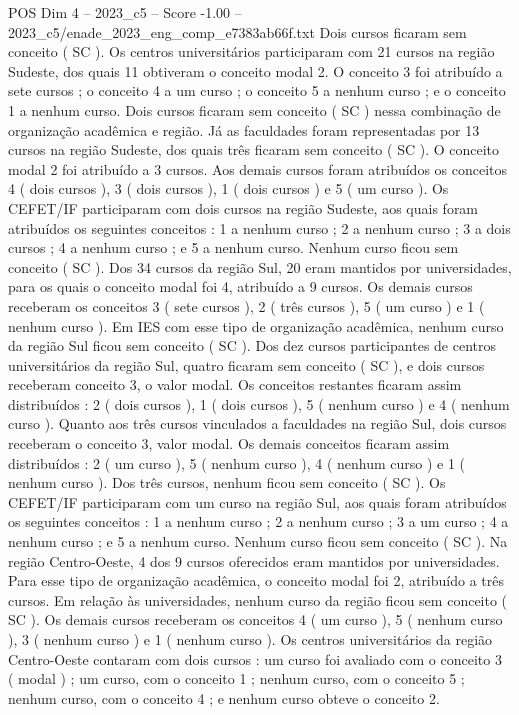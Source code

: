 \begin{textsample}{POS Dim 4 – 2023\_c5 – Score -1.00 – 2023\_c5/enade\_2023\_eng\_comp\_e7383ab66f.txt}
Dois cursos ficaram sem conceito ( SC ).
Os centros universitários participaram com 21 cursos na região Sudeste, dos quais 11 obtiveram o conceito modal 2.
O conceito 3 foi atribuído a sete cursos ; o conceito 4 a um curso ; o conceito 5 a nenhum curso ; e o conceito 1 a nenhum curso.
Dois cursos ficaram sem conceito ( SC ) nessa combinação de organização acadêmica e região.
Já as faculdades foram representadas por 13 cursos na região Sudeste, dos quais três ficaram sem conceito ( SC ).
O conceito modal 2 foi atribuído a 3 cursos.
Aos demais cursos foram atribuídos os conceitos 4 ( dois cursos ), 3 ( dois cursos ), 1 ( dois cursos ) e 5 ( um curso ).
Os CEFET/IF participaram com dois cursos na região Sudeste, aos quais foram atribuídos os seguintes conceitos : 1 a nenhum curso ; 2 a nenhum curso ; 3 a dois cursos ; 4 a nenhum curso ; e 5 a nenhum curso.
Nenhum curso ficou sem conceito ( SC ).
Dos 34 cursos da região Sul, 20 eram mantidos por universidades, para os quais o conceito modal foi 4, atribuído a 9 cursos.
Os demais cursos receberam os conceitos 3 ( sete cursos ), 2 ( três cursos ), 5 ( um curso ) e 1 ( nenhum curso ).
Em IES com esse tipo de organização acadêmica, nenhum curso da região Sul ficou sem conceito ( SC ).
Dos dez cursos participantes de centros universitários da região Sul, quatro ficaram sem conceito ( SC ), e dois cursos receberam conceito 3, o valor modal.
Os conceitos restantes ficaram assim distribuídos : 2 ( dois cursos ), 1 ( dois cursos ), 5 ( nenhum curso ) e 4 ( nenhum curso ).
Quanto aos três cursos vinculados a faculdades na região Sul, dois cursos receberam o conceito 3, valor modal.
Os demais conceitos ficaram assim distribuídos : 2 ( um curso ), 5 ( nenhum curso ), 4 ( nenhum curso ) e 1 ( nenhum curso ).
Dos três cursos, nenhum ficou sem conceito ( SC ).
Os CEFET/IF participaram com um curso na região Sul, aos quais foram atribuídos os seguintes conceitos : 1 a nenhum curso ; 2 a nenhum curso ; 3 a um curso ; 4 a nenhum curso ; e 5 a nenhum curso.
Nenhum curso ficou sem conceito ( SC ).
Na região Centro-Oeste, 4 dos 9 cursos oferecidos eram mantidos por universidades.
Para esse tipo de organização acadêmica, o conceito modal foi 2, atribuído a três cursos.
Em relação às universidades, nenhum curso da região ficou sem conceito ( SC ).
Os demais cursos receberam os conceitos 4 ( um curso ), 5 ( nenhum curso ), 3 ( nenhum curso ) e 1 ( nenhum curso ).
Os centros universitários da região Centro-Oeste contaram com dois cursos : um curso foi avaliado com o conceito 3 ( modal ) ; um curso, com o conceito 1 ; nenhum curso, com o conceito 5 ; nenhum curso, com o conceito 4 ; e nenhum curso obteve o conceito 2.

\end{textsample}
